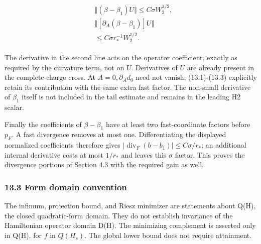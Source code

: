 \begin{gather*}
\begin{aligned}
& \Vert (\beta -\beta _{1})U\Vert \le C \sigma  W_{2}^{1/2}, \\
& \Vert [\partial _{A}(\beta -\beta _{1})]U\Vert \\
& \le C \sigma  r_{*}^{-1}W_{2}^{1/2}.
\end{aligned}\tag{13.4}
\end{gather*}

The derivative in the second line acts on the operator coefficient,
exactly as required by the curvature term, not on \(U\). Derivatives of
\(U\) are already present in the complete-charge cross. At
\(A=0, \partial _{A} d_{0}\) need not vanish; (13.1)-(13.3) explicitly
retain its contribution with the same extra fast factor. The non-small
derivative of \(\beta _{1}\) itself is not included in the tail estimate
and remains in the leading H2 scalar.

Finally the coefficients of \(\beta -\beta _{1}\) have at least two
fast-coordinate factors before \(p_{F}\). A fast divergence removes at
most one. Differentiating the displayed normalized coefficients
therefore gives
\(\vert \operatorname{div} _{F}(b-b_{1})\vert \le C \sigma /r_{*}\); an
additional internal derivative costs at most \(1/r_{*}\) and leaves this
\(\sigma\) factor. This proves the divergence portions of Section
\(4.3\) with the required gain as well.

\subsubsection{13.3 Form domain
convention}\label{i-form-domain-convention}

The infimum, projection bound, and Riesz minimizer are statements about
Q(H), the closed quadratic-form domain. They do not establish invariance
of the Hamiltonian operator domain D(H). The minimizing complement is
asserted only in Q(H), for \(f\) in \(Q(H_{s})\). The global lower bound
does not require attainment.
